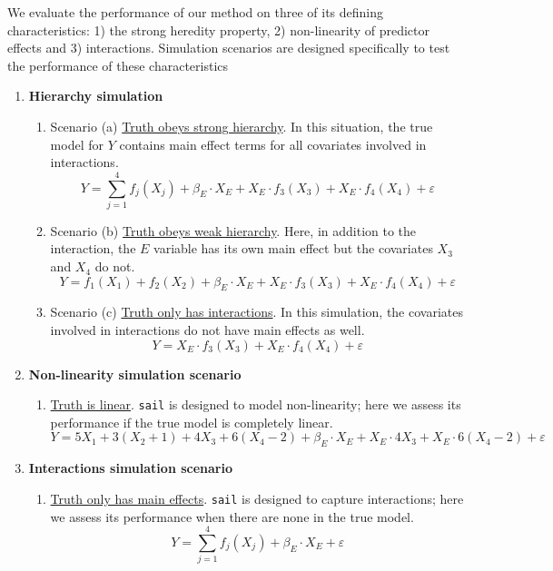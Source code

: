 \documentclass[12pt,letter]{article}\usepackage[]{graphicx}\usepackage[]{color}
\begin{document}
We evaluate the performance of our method on three of its defining characteristics: 1) the strong heredity property, 2) non-linearity of predictor effects and 3) interactions. Simulation scenarios are designed specifically to test the performance of these characteristics


\begin{enumerate}
	\item \textbf{Hierarchy simulation}
	\begin{enumerate}
		\item[] Scenario (a) \underline{Truth obeys strong hierarchy}. In this situation, the true model for $Y$ contains main effect terms for all covariates involved in interactions. \[Y = \sum_{j=1}^{4} f_j(X_{j}) + \beta_E \cdot X_{E} +  X_{E} \cdot f_3(X_{3}) + X_{E} \cdot f_4(X_{4}) + \varepsilon\]
		\item[] Scenario (b) \underline{Truth obeys weak hierarchy}. Here, in addition to the interaction, the $E$ variable has its own main effect but the covariates $X_3$ and $X_4$ do not.
		\[Y = f_1(X_{1}) + f_2(X_{2}) + \beta_E \cdot X_{E} +  X_{E} \cdot f_3(X_{3}) + X_{E} \cdot f_4(X_{4}) + \varepsilon\]
		\item[] Scenario (c) \underline{Truth only has interactions}. In this simulation, the covariates involved in interactions do not have main effects as well.  \[Y =  X_{E} \cdot f_3(X_{3}) + X_{E} \cdot f_4(X_{4}) + \varepsilon\]
	\end{enumerate}

	\item \textbf{Non-linearity simulation scenario}
	\begin{enumerate}
		\item[] \underline{Truth is linear}. \texttt{sail} is designed to model non-linearity; here we assess its performance if the true model is completely linear. \[Y = 5X_1 + 3(X_2 + 1) + 4X_3 + 6(X_4-2) + \beta_E \cdot X_{E} +  X_{E} \cdot 4X_3 + X_{E} \cdot 6(X_4-2) + \varepsilon\]
	\end{enumerate}

	\item \textbf{Interactions simulation scenario}
	\begin{enumerate}

		\item[] \underline{Truth only has main effects}. \texttt{sail} is designed to capture interactions; here we assess its performance when there are none in the true model. \[Y = \sum_{j=1}^{4} f_j(X_{j}) + \beta_E \cdot X_{E} + \varepsilon\]
	\end{enumerate}


\end{enumerate}
\end{document}
